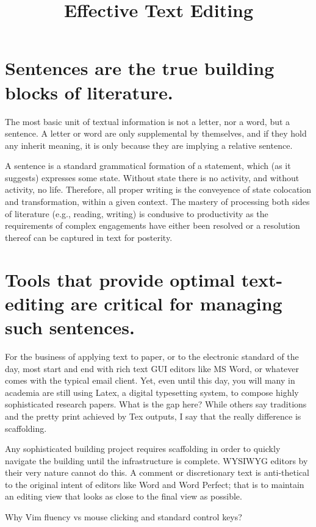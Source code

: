 \documentclass{article}
\title{Effective Text Editing}
\begin{document}
\tableofcontents
\clearpage


\section{Sentences are the true building blocks of literature.}
The most basic unit of textual information is not a letter, nor a word, but a sentence.  A letter or word are only supplemental by themselves, and if they hold any inherit meaning, it is only because they are implying a relative sentence.

A sentence is a standard grammatical formation of a statement, which (as it suggests) expresses some state.  Without state there is no activity, and without activity, no life.  Therefore, all proper writing is the conveyence of state colocation and transformation, within a given context.  The mastery of processing both sides of literature (e.g., reading, writing) is condusive to productivity as the requirements of complex engagements have either been resolved or a resolution thereof can be captured in text for posterity.

\section{Tools that provide optimal text-editing are critical for managing such sentences.}

For the business of applying text to paper, or to the electronic standard of the day, most start and end with rich text GUI editors like MS Word, or whatever comes with the typical email client.  Yet, even until this day, you will many in academia are still using Latex, a digital typesetting system, to compose highly sophisticated research papers.  What is the gap here?  While others say traditions and the pretty print achieved by Tex outputs, I say that the really difference is scaffolding.

Any sophisticated building project requires scaffolding in order to quickly navigate the building until the infrastructure is complete.  WYSIWYG editors by their very nature cannot do this.  A comment or discretionary text is anti-thetical to the original intent of editors like Word and Word Perfect; that is to maintain an editing view that looks as close to the final view as possible.

Why Vim fluency vs mouse clicking and standard control keys?
\end{document}
